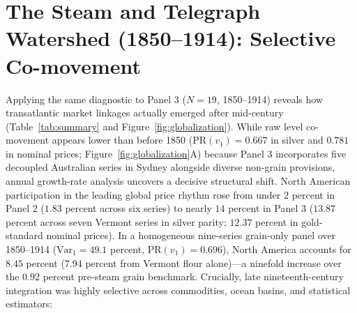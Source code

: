 \documentclass{article}
\begin{document}
\section{The Steam and Telegraph Watershed (1850--1914): Selective Co-movement}
Applying the same diagnostic to Panel 3 ($N=19$, 1850--1914) reveals how transatlantic market linkages actually emerged after mid-century (Table~\ref{tab:summary} and Figure~\ref{fig:globalization}). While raw level co-movement appears lower than before 1850 ($\mathrm{PR}(v_1) = 0.667$ in silver and $0.781$ in nominal prices; Figure~\ref{fig:globalization}A) because Panel 3 incorporates five decoupled Australian series in Sydney alongside diverse non-grain provisions, annual growth-rate analysis uncovers a decisive structural shift. North American participation in the leading global price rhythm rose from under $2$ percent in Panel 2 ($1.83$ percent across six series) to nearly $14$ percent in Panel 3 ($13.87$ percent across seven Vermont series in silver parity; $12.37$ percent in gold-standard nominal prices). In a homogeneous nine-series grain-only panel over 1850--1914 ($\mathrm{Var}_1 = 49.1$ percent, $\mathrm{PR}(v_1) = 0.696$), North America accounts for $8.45$ percent ($7.94$ percent from Vermont flour alone)---a ninefold increase over the $0.92$ percent pre-steam grain benchmark.
Crucially, late nineteenth-century integration was highly selective across commodities, ocean basins, and statistical estimators:
\end{document}
